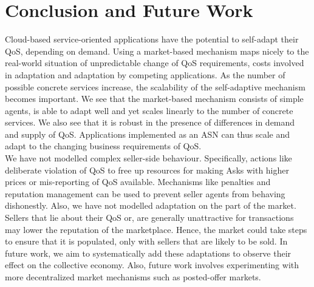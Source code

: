 \documentclass[10pt,journal,compsoc]{IEEEtran}
\begin{document}
\section{Conclusion and Future Work}
Cloud-based service-oriented applications have the potential to self-adapt their QoS, depending on demand. Using a market-based mechanism maps nicely to the real-world situation of unpredictable change of QoS requirements, costs involved in adaptation and adaptation by competing applications. As the number of possible concrete services increase, the scalability of the self-adaptive mechanism becomes important. We see that the market-based mechanism consists of simple agents, is able to adapt well and yet scales linearly to the number of concrete services. We also see that it is robust in the presence of differences in demand and supply of QoS. Applications implemented as an ASN can thus scale and adapt to the changing business requirements of QoS.\\
We have not modelled complex seller-side behaviour. Specifically, actions like deliberate violation of QoS to free up resources for making Asks with higher prices or mis-reporting of QoS available. Mechanisms like penalties and reputation management can be used to prevent seller agents from behaving dishonestly. Also, we have not modelled adaptation on the part of the market. Sellers that lie about their QoS or, are generally unattractive for transactions may lower the reputation of the marketplace. Hence, the market could take steps to ensure that it is populated, only with sellers that are likely to be sold. In future work, we aim to systematically add these adaptations to observe their effect on the collective economy. Also, future work involves experimenting with more decentralized market mechanisms such as posted-offer markets.\\
  
  

\end{document}
